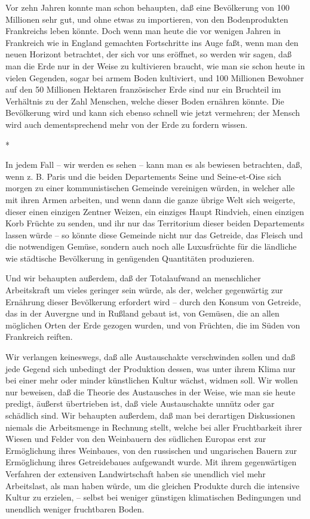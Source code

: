 \documentclass{scrbook}
\begin{document}
Vor zehn Jahren konnte man schon behaupten, daß eine Bevölkerung von 100 Millionen sehr gut, und ohne etwas zu importieren, von den Bodenprodukten Frankreichs leben könnte. Doch wenn man heute die vor wenigen Jahren in Frankreich wie in England gemachten Fortschritte ins Auge faßt, wenn man den neuen Horizont betrachtet, der sich vor uns eröffnet, so werden wir sagen, daß man die Erde nur in der Weise zu kultivieren braucht, wie man sie schon heute in vielen Gegenden, sogar bei armem Boden kultiviert, und 100 Millionen Bewohner auf den 50 Millionen Hektaren französischer Erde sind nur ein Bruchteil im Verhältnis zu der Zahl Menschen, welche dieser Boden ernähren könnte. Die Bevölkerung wird und kann sich ebenso schnell wie jetzt vermehren; der Mensch wird auch dementsprechend mehr von der Erde zu fordern wissen.

\begin{center}*\end{center}

In jedem Fall – wir werden es sehen – kann man es als bewiesen betrachten, daß, wenn z. B. Paris und die beiden Departements Seine und Seine-et-Oise sich morgen zu einer kommunistischen Gemeinde vereinigen würden, in welcher alle mit ihren Armen arbeiten, und wenn dann die ganze übrige Welt sich weigerte, dieser einen einzigen Zentner Weizen, ein einziges Haupt Rindvieh, einen einzigen Korb Früchte zu senden, und ihr nur das Territorium dieser beiden Departements lassen würde – so könnte diese Gemeinde nicht nur das Getreide, das Fleisch und die notwendigen Gemüse, sondern auch noch alle Luxusfrüchte für die ländliche wie städtische Bevölkerung in genügenden Quantitäten produzieren.

Und wir behaupten außerdem, daß der Totalaufwand an menschlicher Arbeitskraft um vieles geringer sein würde, als der, welcher gegenwärtig zur Ernährung dieser Bevölkerung erfordert wird – durch den Konsum von Getreide, das in der Auvergne und in Rußland gebaut ist, von Gemüsen, die an allen möglichen Orten der Erde gezogen wurden, und von Früchten, die im Süden von Frankreich reiften.

Wir verlangen keineswegs, daß alle Austauschakte verschwinden sollen und daß jede Gegend sich unbedingt der Produktion dessen, was unter ihrem Klima nur bei einer mehr oder minder künstlichen Kultur wächst, widmen soll. Wir wollen nur beweisen, daß die Theorie des Austausches in der Weise, wie man sie heute predigt, äußerst übertrieben ist, daß viele Austauschakte unnütz oder gar schädlich sind. Wir behaupten außerdem, daß man bei derartigen Diskussionen niemals die Arbeitsmenge in Rechnung stellt, welche bei aller Fruchtbarkeit ihrer Wiesen und Felder von den Weinbauern des südlichen Europas erst zur Ermöglichung ihres Weinbaues, von den russischen und ungarischen Bauern zur Ermöglichung ihres Getreidebaues aufgewandt wurde. Mit ihrem gegenwärtigen Verfahren der extensiven Landwirtschaft haben sie unendlich viel mehr Arbeitslast, als man haben würde, um die gleichen Produkte durch die intensive Kultur zu erzielen, – selbst bei weniger günstigen klimatischen Bedingungen und unendlich weniger fruchtbaren Boden.
\end{document}
